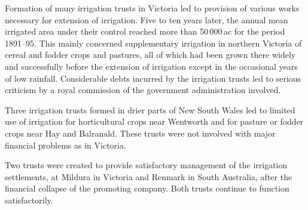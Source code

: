 \closure
Formation of many irrigation trusts in Victoria led to provision of
various works necessary for extension of irrigation.  Five to ten
years later, the annual mean irrigated area under their control
reached more than 50\,000\,ac for the period 1891--95.  This mainly
concerned supplementary irrigation in northern Victoria of cereal and
fodder crops and pastures, all of which had been grown there widely
and successfully before the extension of irrigation except in the
occasional years of low rainfall.  Considerable debts incurred by the
irrigation trusts led to serious criticism by a royal commission of
the government administration involved.

Three irrigation trusts formed in drier parts of New South Wales led
to limited use of irrigation for horticultural crops near Wentworth
and for pasture or fodder crops near Hay and Balranald.  These trusts
were not involved with major financial problems as in Victoria.

Two trusts were created to provide satisfactory management of the
irrigation settlements, at Mildura in Victoria and Renmark in South
Australia, after the financial collapse of the promoting company.
Both trusts continue to function satisfactorily.

